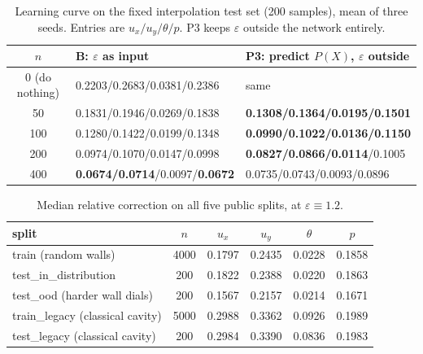 \documentclass[preprint,11pt,a4paper,times,doubleblind]{elsarticle}
\begin{document}
\begin{table}[htbp]
\centering
\footnotesize
\setlength{\tabcolsep}{4pt}
\caption{Learning curve on the fixed interpolation test set (200 samples), mean of three seeds.
Entries are $u_x/u_y/\theta/p$. P3 keeps $\varepsilon$ outside the network entirely.}
\label{tab:learning}
\begin{tabular}{@{}c p{5.0cm}p{5.0cm}@{}}
\toprule
$n$ & B: $\varepsilon$ as input & P3: predict $P(X)$, $\varepsilon$ outside\\
\midrule
0 (do nothing) & 0.2203/0.2683/0.0381/0.2386 & same\\
50 & 0.1831/0.1946/0.0269/0.1838 & \textbf{0.1308/0.1364/0.0195/0.1501}\\
100 & 0.1280/0.1422/0.0199/0.1348 & \textbf{0.0990/0.1022/0.0136/0.1150}\\
200 & 0.0974/0.1070/0.0147/0.0998 & \textbf{0.0827/0.0866/0.0114}/0.1005\\
400 & \textbf{0.0674/0.0714}/0.0097/\textbf{0.0672} & 0.0735/0.0743/0.0093/0.0896\\
\bottomrule
\end{tabular}
\end{table}

\begin{table}[htbp]
\centering
\small
\caption{Median relative correction on all five public splits, at $\varepsilon\equiv1.2$.}
\label{tab:splits}
\begin{tabular}{@{}lccccc@{}}
\toprule
split & $n$ & $u_x$ & $u_y$ & $\theta$ & $p$\\
\midrule
train (random walls) & 4000 & 0.1797 & 0.2435 & 0.0228 & 0.1858\\
test\_in\_distribution & 200 & 0.1822 & 0.2388 & 0.0220 & 0.1863\\
test\_ood (harder wall dials) & 200 & 0.1567 & 0.2157 & 0.0214 & 0.1671\\
train\_legacy (classical cavity) & 5000 & 0.2988 & 0.3362 & 0.0926 & 0.1989\\
test\_legacy (classical cavity) & 200 & 0.2984 & 0.3390 & 0.0836 & 0.1983\\
\bottomrule
\end{tabular}
\end{table}
\end{document}
